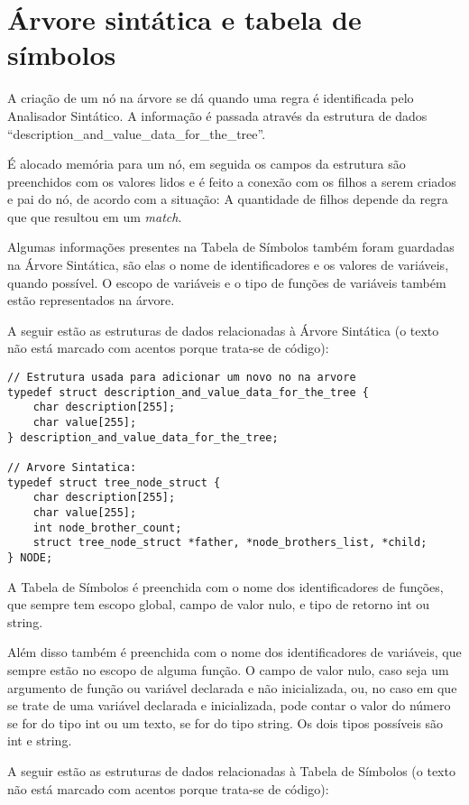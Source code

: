 \documentclass[12pt]{article}
\begin{document}
\section{Árvore sintática e tabela de símbolos}

\indent

A criação de um nó na árvore se dá quando uma regra é identificada pelo Analisador Sintático. A informação é passada através da estrutura de dados ``description\_and\_value\_data\_for\_the\_tree''.

É alocado memória para um nó, em seguida os campos da estrutura são preenchidos com os valores lidos e é feito a conexão com os filhos a serem criados e pai do nó, de acordo com a situação: A quantidade de filhos depende da regra que que resultou em um \textit{match}.

Algumas informações presentes na Tabela de Símbolos também foram guardadas na Árvore Sintática, são elas o nome de identificadores e os valores de variáveis, quando possível. O escopo de variáveis e o tipo de funções de variáveis também estão representados na árvore.

A seguir estão as estruturas de dados relacionadas à Árvore Sintática (o texto não está marcado com acentos porque trata-se de código):

\begin{lstlisting}
// Estrutura usada para adicionar um novo no na arvore
typedef struct description_and_value_data_for_the_tree {
    char description[255];
    char value[255];
} description_and_value_data_for_the_tree;

// Arvore Sintatica:
typedef struct tree_node_struct {
    char description[255];
    char value[255];
    int node_brother_count;
    struct tree_node_struct *father, *node_brothers_list, *child;
} NODE;
\end{lstlisting}

A Tabela de Símbolos é preenchida com o nome dos identificadores de funções, que sempre tem escopo global, campo de valor nulo, e tipo de retorno int ou string.

Além disso também é preenchida com o nome dos identificadores de variáveis, que sempre estão no escopo de alguma função. O campo de valor nulo, caso seja um argumento de função ou variável declarada e não inicializada, ou, no caso em que se trate de uma variável declarada e inicializada, pode contar o valor do número se for do tipo int ou um texto, se for do tipo string. Os dois tipos possíveis são int e string.

A seguir estão as estruturas de dados relacionadas à Tabela de Símbolos (o texto não está marcado com acentos porque trata-se de código):
\end{document}
